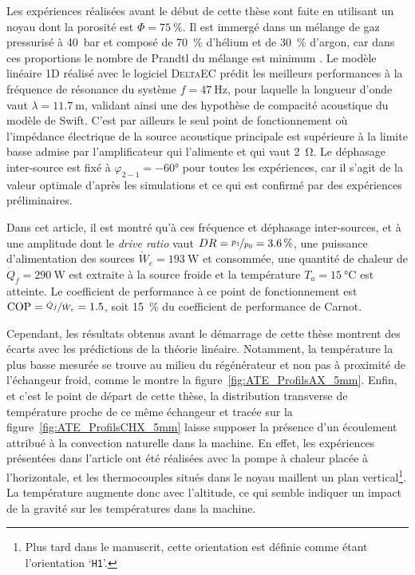 Les expériences réalisées avant le début de cette thèse sont faite en utilisant un noyau dont la porosité est $\Phi=\qty{75}{\percent}$. Il est immergé dans un mélange de gaz pressurisé à \qty{40}{\bar} et composé de \qty{70}{\percent} d'hélium et de \qty{30}{\percent} d'argon, car dans ces proportions le nombre de Prandtl du mélange est minimum \cite{belcher_working_1999}. Le modèle linéaire 1D réalisé avec le logiciel \textsc{DeltaEC} prédit les meilleurs performances à la fréquence de résonance du système $f=\qty{47}{\hertz}$, pour laquelle la longueur d'onde vaut $\lambda=\qty{11.7}{\meter}$, validant ainsi une des hypothèse de compacité acoustique du modèle de Swift. C'est par ailleurs le seul point de fonctionnement où l'impédance électrique de la source acoustique principale est supérieure à la limite basse admise par l'amplificateur qui l'alimente et qui vaut \qty{2}{\ohm}. Le déphasage inter-source est fixé à $\varphi_{2-1}=\ang{-60}$ pour toutes les expériences, car il s'agit de la valeur optimale d'après les simulations et ce qui est confirmé par des expériences préliminaires.

Dans cet article, il est montré qu'à ces fréquence et déphasage inter-sources, et à une amplitude dont le \textit{drive ratio} vaut $DR=\nicefrac{p_1}{p_0}=\qty{3.6}{\percent}$, une puissance d'alimentation des sources $\dot W_e=\qty{193}{\watt}$ et consommée, une quantité de chaleur de $\dot Q_f=\qty{290}{\watt}$ est extraite à la source froide et la température $T_a=\qty{15}{\degreeCelsius}$ est atteinte. Le coefficient de performance à ce point de fonctionnement est $\mathrm{COP}=\nicefrac{\dot Q_f}{\dot W_e}=\num{1.5}$, soit \qty{15}{\percent} du coefficient de performance de Carnot.\smallskip

Cependant, les résultats obtenus avant le démarrage de cette thèse montrent des écarts avec les prédictions de la théorie linéaire. Notamment, la température la plus basse mesurée se trouve au milieu du régénérateur et non pas à proximité de l'échangeur froid, comme le montre la figure~\ref{fig:ATE_ProfilsAX_5mm}. Enfin, et c'est le point de départ de cette thèse, la distribution transverse de température proche de ce même échangeur et tracée sur la figure~\ref{fig:ATE_ProfilsCHX_5mm}  laisse supposer la présence d'un écoulement attribué à la convection naturelle dans la machine. En effet, les expériences présentées dans l'article ont été réalisées avec la pompe à chaleur placée à l'horizontale, et les thermocouples situés dans le noyau maillent un plan vertical\footnote{Plus tard dans le manuscrit, cette orientation est définie comme étant l'orientation `\texttt{H1}'.}. La température augmente donc avec l'altitude, ce qui semble indiquer un impact de la gravité sur les températures dans la machine.

